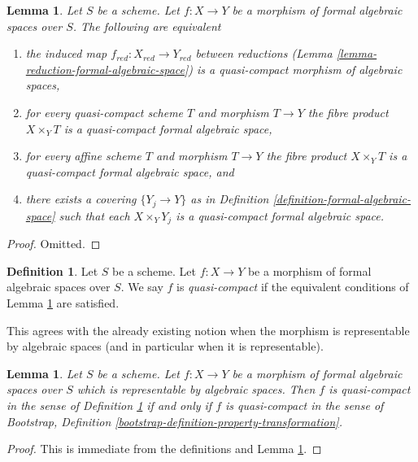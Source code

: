 \documentclass{stacks-project}
\theoremstyle{plain}
\newtheorem{lemma}[subsection]{Lemma}
\theoremstyle{definition}
\newtheorem{definition}[subsection]{Definition}
\theoremstyle{remark}
\numberwithin{equation}{subsection}
\begin{document}
\begin{lemma}
\label{lemma-characterize-quasi-compact-morphism}
Let $S$ be a scheme. Let $f : X \to Y$ be a morphism of formal algebraic
spaces over $S$. The following are equivalent
\begin{enumerate}
\item the induced map $f_{red} : X_{red} \to Y_{red}$ between reductions
(Lemma \ref{lemma-reduction-formal-algebraic-space}) is a quasi-compact
morphism of algebraic spaces,
\item for every quasi-compact scheme $T$ and morphism $T \to Y$
the fibre product $X \times_Y T$ is a quasi-compact formal
algebraic space,
\item for every affine scheme $T$ and morphism $T \to Y$
the fibre product $X \times_Y T$ is a quasi-compact formal
algebraic space, and
\item there exists a covering $\{Y_j \to Y\}$ as in
Definition \ref{definition-formal-algebraic-space}
such that each $X \times_Y Y_j$ is a quasi-compact formal algebraic space.
\end{enumerate}
\end{lemma}

\begin{proof}
Omitted.
\end{proof}

\begin{definition}
\label{definition-quasi-compact-morphism}
Let $S$ be a scheme. Let $f : X \to Y$ be a morphism of
formal algebraic spaces over $S$.
We say $f$ is {\it quasi-compact} if the equivalent conditions of
Lemma \ref{lemma-characterize-quasi-compact-morphism} are satisfied.
\end{definition}

\noindent
This agrees with the already existing notion when the morphism
is representable by algebraic spaces (and in particular when it is
representable).

\begin{lemma}
\label{lemma-quasi-compact-representable}
Let $S$ be a scheme. Let $f : X \to Y$ be a morphism of formal algebraic
spaces over $S$ which is representable by algebraic spaces.
Then $f$ is quasi-compact in the sense of
Definition \ref{definition-quasi-compact-morphism}
if and only if $f$ is quasi-compact in the sense of
Bootstrap, Definition \ref{bootstrap-definition-property-transformation}.
\end{lemma}

\begin{proof}
This is immediate from the definitions and
Lemma \ref{lemma-characterize-quasi-compact-morphism}.
\end{proof}
\end{document}
